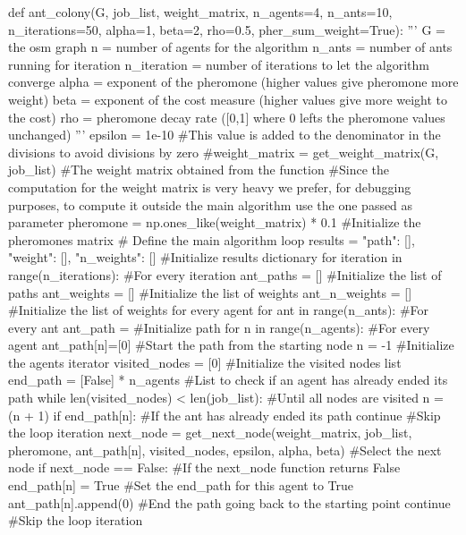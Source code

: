 \documentclass[titlepage]{article}
\begin{document}
\begin{python}
def ant_colony(G, job_list, weight_matrix, n_agents=4, n_ants=10, n_iterations=50, alpha=1, beta=2, rho=0.5, pher_sum_weight=True):
    '''
    G = the osm graph
    n = number of agents for the algorithm
    n_ants = number of ants running for iteration
    n_iteration = number of iterations to let the algorithm converge
    alpha = exponent of the pheromone (higher values give pheromone more weight)
    beta = exponent of the cost measure (higher values give more weight to the cost)
    rho = pheromone decay rate ([0,1] where 0 lefts the pheromone values unchanged)
    '''
    epsilon = 1e-10 #This value is added to the denominator in the divisions to avoid divisions by zero
    #weight_matrix = get_weight_matrix(G, job_list) #The weight matrix obtained from the function
    #Since the computation for the weight matrix is very heavy we prefer, for debugging purposes, to compute it outside the main algorithm use the one passed as parameter
    pheromone = np.ones_like(weight_matrix) * 0.1 #Initialize the pheromones matrix
    # Define the main algorithm loop
    results = {"path": [], "weight": [], "n_weights": []} #Initialize results dictionary
    for iteration in range(n_iterations): #For every iteration
        ant_paths = [] #Initialize the list of paths
        ant_weights = [] #Initialize the list of weights
        ant_n_weights = [] #Initialize the list of weights for every agent
        for ant in range(n_ants): #For every ant
            ant_path = {} #Initialize path
            for n in range(n_agents): #For every agent
                ant_path[n]=[0] #Start the path from the starting node
            n = -1 #Initialize the agents iterator
            visited_nodes = [0] #Initialize the visited nodes list
            end_path = [False] * n_agents #List to check if an agent has already ended its path
            while len(visited_nodes) < len(job_list): #Until all nodes are visited
                n = (n + 1) %
                if end_path[n]: #If the ant has already ended its path
                    continue #Skip the loop iteration
                next_node = get_next_node(weight_matrix, job_list, pheromone, ant_path[n], visited_nodes, epsilon, alpha, beta) #Select the next node
                if next_node == False: #If the next_node function returns False
                    end_path[n] = True #Set the end_path for this agent to True
                    ant_path[n].append(0) #End the path going back to the starting point
                    continue #Skip the loop iteration

\end{python}
\end{document}
